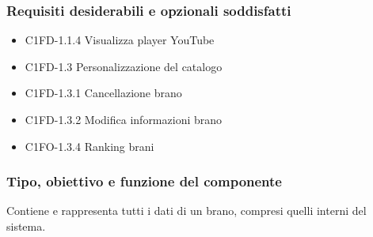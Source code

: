 \subsubsection*{Requisiti desiderabili e opzionali soddisfatti}
\begin{itemize}
    \item C1FD-1.1.4 Visualizza player YouTube
    \item C1FD-1.3 Personalizzazione del catalogo
    \item C1FD-1.3.1 Cancellazione brano
    \item C1FD-1.3.2 Modifica informazioni brano
    \item C1FO-1.3.4 Ranking brani
\end{itemize}
\subsubsection*{Tipo, obiettivo e funzione del componente}
Contiene e rappresenta tutti i dati di un brano, compresi quelli interni del
sistema.
